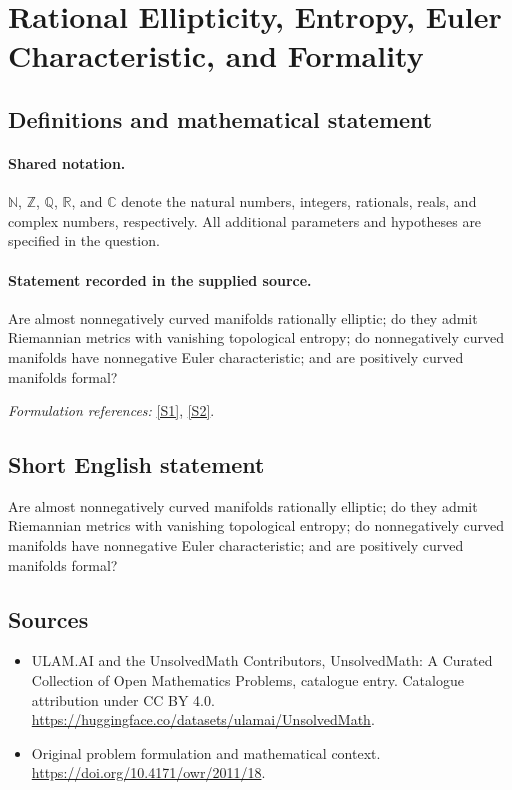 \documentclass[11pt]{article}
\newcommand{\sref}[2]{\hyperlink{source:#1:#2}{[S#2]}}
\begin{document}
\section{Rational Ellipticity, Entropy, Euler Characteristic, and Formality}\label{statement}

\subsection{Definitions and mathematical statement}

\paragraph{Shared notation.}$\mathbb N$, $\mathbb Z$, $\mathbb Q$, $\mathbb R$, and $\mathbb C$ denote the natural numbers, integers, rationals, reals, and complex numbers, respectively. All additional parameters and hypotheses are specified in the question.


\paragraph{Statement recorded in the supplied source.}
Are almost nonnegatively curved manifolds rationally elliptic; do they admit Riemannian metrics with vanishing topological entropy; do nonnegatively curved manifolds have nonnegative Euler characteristic; and are positively curved manifolds formal?
\par\smallskip\textit{Formulation references:} \sref{statement}{1}, \sref{statement}{2}.
\subsection{Short English statement}
Are almost nonnegatively curved manifolds rationally elliptic; do they admit Riemannian metrics with vanishing topological entropy; do nonnegatively curved manifolds have nonnegative Euler characteristic; and are positively curved manifolds formal?
\subsection{Sources}
\begin{itemize}
\item[\hypertarget{source:statement:1}{S1}] ULAM.AI and the UnsolvedMath Contributors, UnsolvedMath: A Curated Collection of Open Mathematics Problems, catalogue entry. Catalogue attribution under CC BY 4.0.
\url{https://huggingface.co/datasets/ulamai/UnsolvedMath}.
\item[\hypertarget{source:statement:2}{S2}] Original problem formulation and mathematical context.
\url{https://doi.org/10.4171/owr/2011/18}.
\end{itemize}
\label{end:statement}
\end{document}
